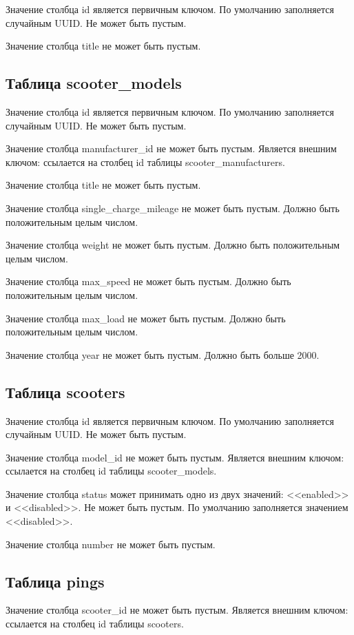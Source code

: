 Значение столбца id является первичным ключом. По умолчанию заполняется случайным UUID. Не может быть пустым.

Значение столбца title не может быть пустым.

\subsection{Таблица scooter\_models}

Значение столбца id является первичным ключом. По умолчанию заполняется случайным UUID. Не может быть пустым.

Значение столбца manufacturer\_id не может быть пустым. Является внешним ключом: ссылается на столбец id таблицы scooter\_manufacturers.

Значение столбца title не может быть пустым.

Значение столбца single\_charge\_mileage не может быть пустым. Должно быть положительным целым числом.

Значение столбца weight не может быть пустым. Должно быть положительным целым числом.

Значение столбца max\_speed не может быть пустым. Должно быть положительным целым числом.

Значение столбца max\_load не может быть пустым. Должно быть положительным целым числом.

Значение столбца year не может быть пустым. Должно быть больше 2000.

\subsection{Таблица scooters}

Значение столбца id является первичным ключом. По умолчанию заполняется случайным UUID. Не может быть пустым.

Значение столбца model\_id не может быть пустым. Является внешним ключом: ссылается на столбец id таблицы scooter\_models.

Значение столбца status может принимать одно из двух значений: <<enabled>> и <<disabled>>. Не может быть пустым. По умолчанию заполняется значением <<disabled>>.

Значение столбца number не может быть пустым.

\subsection{Таблица pings}

Значение столбца scooter\_id не может быть пустым. Является внешним ключом: ссылается на столбец id таблицы scooters.

